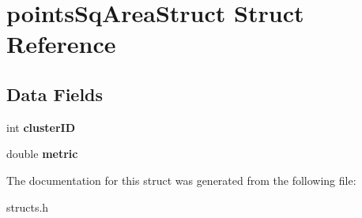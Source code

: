\hypertarget{structpointsSqAreaStruct}{\section{points\-Sq\-Area\-Struct Struct Reference}
\label{structpointsSqAreaStruct}
}
\subsection*{Data Fields}
\begin{DoxyCompactItemize}
\item 
\hypertarget{structpointsSqAreaStruct_a8bf766a32f01c3161519fd5d1cdc4409}{int {\bfseries cluster\-I\-D}}\label{structpointsSqAreaStruct_a8bf766a32f01c3161519fd5d1cdc4409}

\item 
\hypertarget{structpointsSqAreaStruct_a36f8a2d5fb2ec04c869b9a28eea9589e}{double {\bfseries metric}}\label{structpointsSqAreaStruct_a36f8a2d5fb2ec04c869b9a28eea9589e}

\end{DoxyCompactItemize}


The documentation for this struct was generated from the following file\-:\begin{DoxyCompactItemize}
\item 
structs.\-h\end{DoxyCompactItemize}
